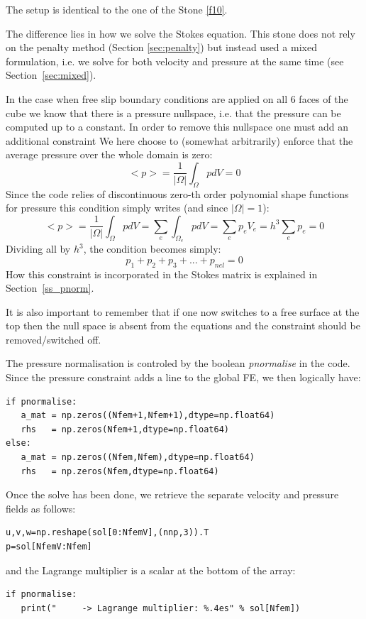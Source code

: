 

The setup is identical to the one of the Stone \ref{f10}.

The difference lies in how we solve the Stokes equation. This stone does not rely on 
the penalty method (Section \ref{sec:penalty}) 
but instead used a mixed formulation, i.e. we solve for both 
velocity and pressure at the same time (see Section~\ref{sec:mixed}).

In the case when free slip boundary conditions are applied on all 
6 faces of the cube we know that there is a pressure nullspace, i.e.
that the pressure can be computed up to a constant. In order to 
remove this nullspace one must add an additional constraint 
We here choose to (somewhat arbitrarily) enforce that the average pressure 
over the whole domain is zero:
\[
<p>=\frac{1}{|\Omega|} \int_\Omega p dV =0 
\]
Since the code relies of discontinuous zero-th order polynomial shape functions 
for pressure this condition simply writes (and since $|\Omega|=1$):
\[
<p>=\frac{1}{|\Omega|} \int_\Omega p dV =  \sum_{e} \int_{\Omega_e} p dV = \sum_e p_e V_e = h^3 \sum_e p_e =0
\]
Dividing all by $h^3$, the condition becomes simply:
\[
p_1 + p_2 + p_3 + ... + p_{nel} = 0
\]
How this constraint is incorporated in the Stokes matrix is explained in Section~\ref{ss_pnorm}.

It is also important to remember that if one now switches to a free surface at the top then 
the null space is absent from the equations and the constraint should be removed/switched off.

The pressure normalisation is controled by the boolean {\sl pnormalise} in the code. 
Since the pressure constraint adds a line to the global FE, we then logically have:
\begin{lstlisting}
if pnormalise:
   a_mat = np.zeros((Nfem+1,Nfem+1),dtype=np.float64) 
   rhs   = np.zeros(Nfem+1,dtype=np.float64)    
else:
   a_mat = np.zeros((Nfem,Nfem),dtype=np.float64)
   rhs   = np.zeros(Nfem,dtype=np.float64)       
\end{lstlisting} 
Once the solve has been done, we retrieve the separate velocity and pressure fields as follows:
\begin{lstlisting}
u,v,w=np.reshape(sol[0:NfemV],(nnp,3)).T
p=sol[NfemV:Nfem]
\end{lstlisting} 
and the Lagrange multiplier is a scalar at the bottom of the array:
\begin{lstlisting}
if pnormalise:
   print("     -> Lagrange multiplier: %.4es" % sol[Nfem])
\end{lstlisting} 


